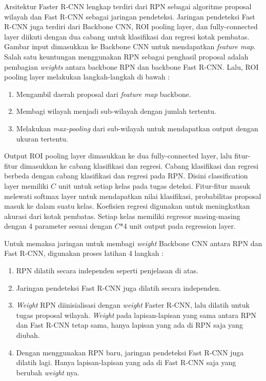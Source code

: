 \documentclass{article}
\begin{document}
   	\par Arsitektur Faster R-CNN lengkap terdiri dari RPN sebagai algoritme proposal wilayah dan Fast R-CNN sebagai jaringan pendeteksi. Jaringan pendeteksi Fast R-CNN juga terdiri dari Backbone CNN, ROI pooling layer, dan fully-connected layer diikuti dengan dua cabang untuk klasifikasi dan regresi kotak pembatas. Gambar input dimasukkan ke Backbone CNN untuk mendapatkan \textit{feature map}. Salah satu keuntungan menggunakan RPN sebagai penghasil proposal adalah pembagian \textit{weights} antara backbone RPN dan backbone Fast R-CNN. Lalu, ROI pooling layer melakukan langkah-langkah di bawah :
   	\begin{enumerate}
   		\item Mengambil daerah proposal dari \textit{feature map} backbone.
   		\item Membagi wilayah menjadi sub-wilayah dengan jumlah tertentu.
   		\item Melakukan \textit{max-pooling} dari sub-wilayah untuk mendapatkan output dengan ukuran tertentu.
   	\end{enumerate}
   
   	\par Output ROI pooling layer dimasukkan ke dua fully-connected layer, lalu fitur-fitur dimasukkan ke cabang klasifikasi dan regresi. Cabang klasifikasi dan regresi berbeda dengan cabang klasifikasi dan regresi pada RPN. Disini classification layer memiliki $C$ unit untuk setiap kelas pada tugas deteksi. Fitur-fitur masuk melewati softmax layer untuk mendapatkan nilai klasifikasi, probabilitas proposal masuk ke dalam suatu kelas. Koefisien regresi digunakan untuk meningkatkan akurasi dari kotak pembatas. Setiap kelas memiliki regresor masing-masing dengan 4 parameter sesuai dengan $C$*4 unit output pada regression layer.
   	
   	\par Untuk memaksa jaringan untuk membagi \textit{weight} Backbone CNN antara RPN dan Fast R-CNN, digunakan proses latihan 4 langkah :
   	\begin{enumerate}
   		\item RPN dilatih secara independen seperti penjelasan di atas.
   		\item Jaringan pendeteksi Fast R-CNN juga dilatih secara independen.
   		\item \textit{Weight} RPN diinisialisasi dengan \textit{weight} Faster R-CNN, lalu dilatih untuk tugas proposal wilayah. \textit{Weight} pada lapisan-lapisan yang sama antara RPN dan Fast R-CNN tetap sama, hanya lapisan yang ada di RPN saja yang diubah.
   		\item Dengan menggunakan RPN baru, jaringan pendeteksi Fast R-CNN juga dilatih lagi. Hanya lapisan-lapisan yang ada di Fast R-CNN saja yang berubah \textit{weight} nya. 
   	\end{enumerate}
   	
\end{document}
